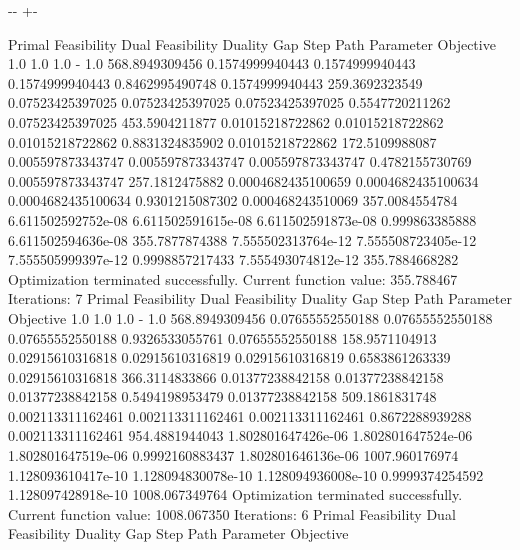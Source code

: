 \documentclass[letterpaper,10pt,english]{sphinxmanual}
\newlength\nbsphinxcodecellspacing
\begin{document}
{

\kern-\sphinxverbatimsmallskipamount\kern-\baselineskip
\kern+\FrameHeightAdjust\kern-\fboxrule
\vspace{\nbsphinxcodecellspacing}

\begin{sphinxVerbatim}[commandchars=\\\{\}]
Primal Feasibility  Dual Feasibility    Duality Gap         Step             Path Parameter      Objective
1.0                 1.0                 1.0                 -                1.0                 568.8949309456
0.1574999940443     0.1574999940443     0.1574999940443     0.8462995490748  0.1574999940443     259.3692323549
0.07523425397025    0.07523425397025    0.07523425397025    0.5547720211262  0.07523425397025    453.5904211877
0.01015218722862    0.01015218722862    0.01015218722862    0.8831324835902  0.01015218722862    172.5109988087
0.005597873343747   0.005597873343747   0.005597873343747   0.4782155730769  0.005597873343747   257.1812475882
0.0004682435100659  0.0004682435100634  0.0004682435100634  0.9301215087302  0.000468243510069   357.0084554784
6.611502592752e-08  6.611502591615e-08  6.611502591873e-08  0.999863385888   6.611502594636e-08  355.7877874388
7.555502313764e-12  7.555508723405e-12  7.555505999397e-12  0.9998857217433  7.555493074812e-12  355.7884668282
Optimization terminated successfully.
         Current function value: 355.788467
         Iterations: 7
Primal Feasibility  Dual Feasibility    Duality Gap         Step             Path Parameter      Objective
1.0                 1.0                 1.0                 -                1.0                 568.8949309456
0.07655552550188    0.07655552550188    0.07655552550188    0.9326533055761  0.07655552550188    158.9571104913
0.02915610316818    0.02915610316819    0.02915610316819    0.6583861263339  0.02915610316818    366.3114833866
0.01377238842158    0.01377238842158    0.01377238842158    0.5494198953479  0.01377238842158    509.1861831748
0.002113311162461   0.002113311162461   0.002113311162461   0.8672288939288  0.002113311162461   954.4881944043
1.802801647426e-06  1.802801647524e-06  1.802801647519e-06  0.9992160883437  1.802801646136e-06  1007.960176974
1.128093610417e-10  1.128094830078e-10  1.128094936008e-10  0.9999374254592  1.128097428918e-10  1008.067349764
Optimization terminated successfully.
         Current function value: 1008.067350
         Iterations: 6
Primal Feasibility  Dual Feasibility    Duality Gap         Step             Path Parameter      Objective

\end{sphinxVerbatim}}
\end{document}
